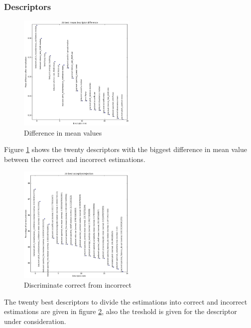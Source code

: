 \documentclass{proc}
\begin{document}
\subsubsection{Descriptors}
\begin{figure}
    \centering
    \includegraphics[width=0.5\textwidth]{img/pred_descr.png}
    \caption{Difference in mean values}
    \label{fig:pred_desc}
\end{figure}
Figure \ref{fig:pred_desc} shows the twenty descriptors with the biggest difference in mean value between the correct and incorrect estimations. 
\begin{figure}
    \centering
    \includegraphics[width=0.5\textwidth]{img/pn_descr.png}
    \caption{Discriminate correct from incorrect}
    \label{fig:pn_desc}
\end{figure}
 The twenty best descriptors to divide the estimations into correct and incorrect estimations are given in figure \ref{fig:pn_desc}, also the treshold is given for the descriptor under consideration.
\end{document}
